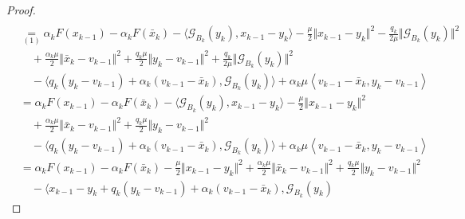 \documentclass[12pt]{article}
\begin{document}
\begin{proof}
{\begin{align*}
                \\
                &\underset{(1)}{=} 
                \alpha_kF(x_{k - 1}) - \alpha_k F(\bar x_k)
                - \langle \mathcal G_{B_k}(y_k), x_{k - 1} - y_k\rangle
                - \frac{\mu}{2}\Vert x_{k - 1} - y_k\Vert^2 
                - \frac{q_k}{2\mu}\Vert \mathcal G_{B_k}(y_k)\Vert^2
                    \\&\quad 
                    + \frac{\alpha_k \mu}{2}
                    \Vert \bar x_k - v_{k - 1}\Vert^2
                    + \frac{q_k\mu}{2}\Vert y_k - v_{k - 1} \Vert^2
                    + \frac{q_k}{2\mu}\Vert \mathcal G_{B_k}(y_k)\Vert^2
                    \\ &\quad 
                    - \langle
                        q_k(y_k - v_{k - 1}) + \alpha_k(v_{k - 1} - \bar x_k), \mathcal G_{B_k}(y_k)
                    \rangle
                    + \alpha_k \mu
                    \left\langle 
                        v_{k - 1} - \bar x_k, 
                        y_k - v_{k - 1}
                    \right\rangle
                \\
                &= 
                \alpha_kF(x_{k - 1}) - \alpha_k F(\bar x_k)
                - \langle \mathcal G_{B_k}(y_k), x_{k - 1} - y_k\rangle
                - \frac{\mu}{2}\Vert x_{k - 1} - y_k\Vert^2 
                    \\&\quad 
                    + \frac{\alpha_k \mu}{2}
                    \Vert \bar x_k - v_{k - 1}\Vert^2
                    + \frac{q_k\mu}{2}\Vert y_k - v_{k - 1} \Vert^2
                    \\ &\quad 
                    - \langle
                        q_k(y_k - v_{k - 1}) + \alpha_k(v_{k - 1} - \bar x_k), \mathcal G_{B_k}(y_k)
                    \rangle
                    + \alpha_k \mu
                    \left\langle 
                        v_{k - 1} - \bar x_k, 
                        y_k - v_{k - 1}
                    \right\rangle
                \\
                &= 
                \alpha_kF(x_{k - 1}) - \alpha_k F(\bar x_k)
                - \frac{\mu}{2}\Vert x_{k - 1} - y_k\Vert^2 
                + \frac{\alpha_k \mu}{2}
                \Vert \bar x_k - v_{k - 1}\Vert^2
                + \frac{q_k\mu}{2}\Vert y_k - v_{k - 1} \Vert^2
                    \\ &\quad 
                    - \langle
                        x_{k - 1} - y_k + q_k(y_k - v_{k - 1}) + \alpha_k(v_{k - 1} - \bar x_k), 
                        \mathcal G_{B_k}(y_k)

\end{align*}}
\end{proof}
\end{document}
